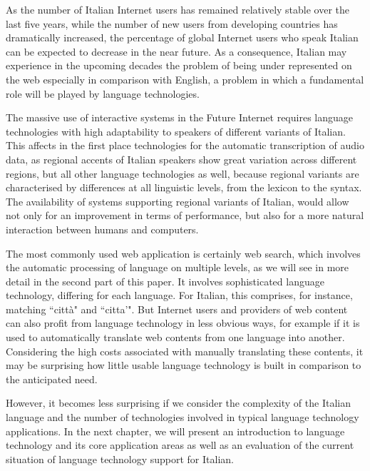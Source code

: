 \documentclass[]{../../metanetpaper}
\begin{document}
\begin{multicols}{2}
As the number of Italian Internet users has remained relatively stable over
the last five years, while the number of new users from developing countries
has dramatically increased, the percentage of global Internet users who speak
Italian can be expected to decrease in the near future. As a consequence,
Italian may experience in the upcoming decades the problem of being under
represented on the web especially in comparison with English, a problem in
which a fundamental role will be played by language technologies.



The massive use of interactive systems in the Future Internet requires
language technologies with high adaptability to speakers of different variants
of Italian. This affects in the first place technologies for the automatic
transcription of audio data, as regional accents of Italian speakers show
great variation across different regions, but all other language technologies
as well, because regional variants are characterised by differences at all
linguistic levels, from the lexicon to the syntax. The availability of systems
supporting regional variants of Italian, would allow not only for an
improvement in terms of performance, but also for a more natural interaction
between humans and computers.
 
The most commonly used web application is certainly web search, which involves
the automatic processing of language on multiple levels, as we will see in
more detail in the second part of this paper. It involves sophisticated
language technology, differing for each language. For Italian, this comprises,
for instance, matching “citt\`{a}" and “citta'". But Internet
users and providers of web content can also profit from language technology in
less obvious ways, for example if it is used to automatically translate web
contents from one language into another. Considering the high costs associated
with manually translating these contents, it may be surprising how little
usable language technology is built in comparison to the anticipated need.

However, it becomes less surprising if we consider the complexity of the
Italian language and the number of technologies involved in typical language 
technology applications. In the next chapter, we will present an introduction 
to language technology and its core application areas as well as an evaluation 
of the current situation of language technology support for Italian. 


\end{multicols}
\end{document}
